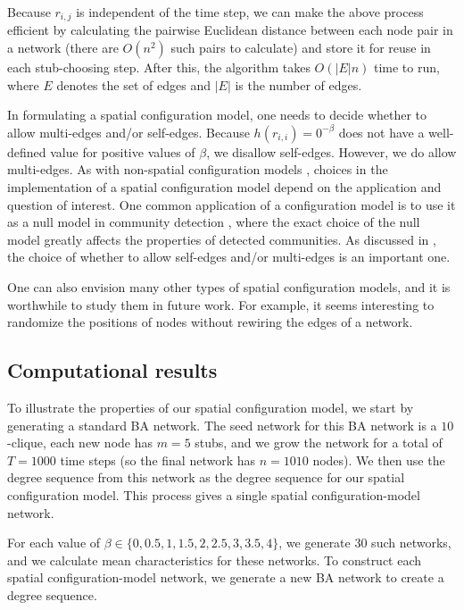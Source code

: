 \documentclass[%
 reprint,
 amsmath,amssymb,
 aps,
]{revtex4-1}
\begin{document}
Because $r_{i,j}$ is independent of the time step, we can make the above process efficient by calculating the pairwise Euclidean distance between each node pair in a network (there are $O(n^2)$ such pairs to calculate) and store it for reuse in each stub-choosing step. After this, the algorithm takes $O(|E| n)$ time to run, where $E$ denotes the set of edges and $|E|$ is the number of edges.

In formulating a spatial configuration model, one needs to decide whether to allow multi-edges and/or self-edges. Because $h(r_{i,i}) = 0^{-\beta}$ does not have a well-defined value for positive values of $\beta$, we disallow self-edges. However, we do allow multi-edges. As with non-spatial configuration models \cite{fosdick}, choices in the implementation of a spatial configuration model
depend on the application and question of interest. One common application of a configuration model is to use it as a null model in community detection \cite{forcechains, community1, community2}, where the exact choice of the null model greatly affects the properties of detected communities. As discussed in \cite{fosdick}, the choice of whether to allow self-edges and/or multi-edges is an important one.

One can also envision many other types of spatial configuration models, and it is worthwhile to study them in future work. For example, it seems interesting to 
randomize the positions of nodes without rewiring the edges of a network. 



\subsection{Computational results}

To illustrate the properties of our spatial configuration model, we start by generating a standard BA network. The seed network for this BA network is a $10$-clique, each new node has $m=5$ stubs, and we grow the network for a total of $T=1000$ time steps (so the final network has $n=1010$ nodes). We then use the degree sequence from this network as the degree sequence for our spatial configuration model. This process gives a single spatial configuration-model network.

For each value of $\beta \in \{0, 0.5, 1, 1.5, 2, 2.5, 3, 3.5, 4\}$, we generate $30$ such networks, and we calculate mean characteristics for these networks. To construct each spatial configuration-model network, we generate a new BA network to create a degree sequence.
\end{document}
